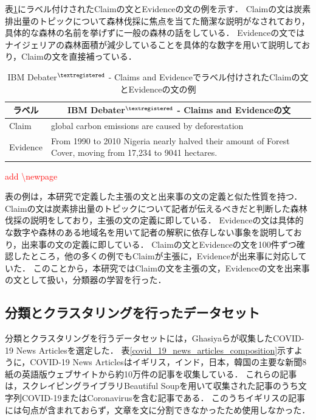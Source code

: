 \documentclass[12pt,a4j]{jreport}
\begin{document}
表\ref{claim_evidence_example}にラベル付けされたClaimの文とEvidenceの文の例を示す．
Claimの文は炭素排出量のトピックについて森林伐採に焦点を当てた簡潔な説明がなされており，具体的な森林の名前を挙げずに一般の森林の話をしている．
Evidenceの文ではナイジェリアの森林面積が減少していることを具体的な数字を用いて説明しており，Claimの文を直接補っている．

\begin{table}[H]
  \caption{IBM Debater$^{\textregistered}$ - Claims and Evidenceでラベル付けされたClaimの文とEvidenceの文の例}
  \vspace{4mm}
  \centering
  \begin{tabular}{lp{12.3cm}}
    \hline
    \multicolumn{1}{c}{ラベル} & \multicolumn{1}{c}{IBM Debater$^{\textregistered}$ - Claims and Evidenceの文}
    \\
    \hline
    Claim & global carbon emissions are caused by deforestation
    \\
    Evidence & \baselineskip=16pt
    From 1990 to 2010 Nigeria nearly halved their amount of Forest Cover, moving from 17,234 to 9041 hectares.
    \\[0.5mm]
    \hline
  \end{tabular}
  \label{claim_evidence_example}
\end{table}

\textcolor{red}{add \textbackslash newpage}
\newpage

表の例は，本研究で定義した主張の文と出来事の文の定義と似た性質を持つ．
Claimの文は炭素排出量のトピックについて記者が伝えるべきだと判断した森林伐採の説明をしており，主張の文の定義に即している．
Evidenceの文は具体的な数字や森林のある地域名を用いて記者の解釈に依存しない事象を説明しており，出来事の文の定義に即している．
Claimの文とEvidenceの文を100件ずつ確認したところ，他の多くの例でもClaimが主張に，Evidenceが出来事に対応していた．
このことから，本研究ではClaimの文を主張の文，Evidenceの文を出来事の文として扱い，分類器の学習を行った．


\subsection{分類とクラスタリングを行ったデータセット}
分類とクラスタリングを行うデータセットには，Ghasiyaらが収集したCOVID-19 News Articlesを選定した\textcolor{red}{\cite{ghasiya_investigating_2021}}．
表\ref{covid_19_news_articles_composition}示すように，COVID-19 News Articlesはイギリス，インド，日本，韓国の主要な新聞8紙の英語版ウェブサイトから約10万件の記事を収集している．
これらの記事は，スクレイピングライブラリBeautiful Soupを用いて収集された記事のうち文字列COVID-19またはCoronavirusを含む記事である．
このうちイギリスの記事には句点が含まれておらず，文章を文に分割できなかったため使用しなかった．
\end{document}
